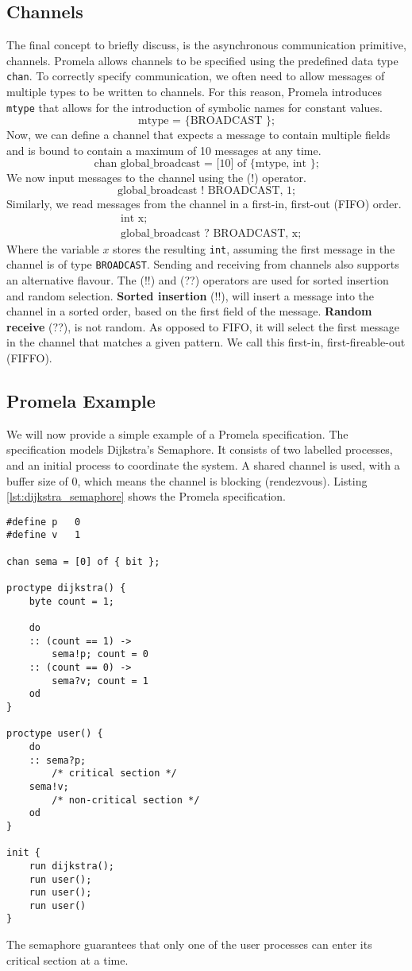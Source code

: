 \subsection{Channels}
The final concept to briefly discuss, is the asynchronous communication primitive, channels. Promela allows channels to be specified using the predefined data type \texttt{chan}. To correctly specify communication, we often need to allow messages of multiple types to be written to channels. For this reason, Promela introduces \texttt{mtype} that allows for the introduction of symbolic names for constant values.
\[
\text{mtype = \{ BROADCAST \};}
\]
Now, we can define a channel that expects a message to contain multiple fields and is bound to contain a maximum of 10 messages at any time.
\[
\text{chan global\_broadcast = [10] of \{ mtype, int \};}
\]
We now input messages to the channel using the (!) operator.
\[
\text{global\_broadcast ! BROADCAST, 1;}
\]
Similarly, we read messages from the channel in a first-in, first-out (FIFO) order.
\[
\begin{aligned}
& \text{int x;} \\
& \text{global\_broadcast ? BROADCAST, x;}
\end{aligned}
\]
Where the variable $x$ stores the resulting \texttt{int}, assuming the first message in the channel is of type \texttt{BROADCAST}. Sending and receiving from channels also supports an alternative flavour. The (!!) and (??) operators are used for sorted insertion and random selection. \textbf{Sorted insertion} (!!), will insert a message into the channel in a sorted order, based on the first field of the message. \textbf{Random receive} (??), is not random. As opposed to FIFO, it will select the first message in the channel that matches a given pattern. We call this first-in, first-fireable-out (FIFFO).
\subsection{Promela Example}
We will now provide a simple example of a Promela specification. The specification models Dijkstra's Semaphore. It consists of two labelled processes, and an initial process to coordinate the system. A shared channel is used, with a buffer size of 0, which means the channel is blocking (rendezvous). Listing \ref{lst:dijkstra_semaphore} shows the Promela specification.
\begin{lstlisting}[language=promela, xleftmargin=.3\linewidth, caption={Dijkstra's Semaphore in Promela}, label={lst:dijkstra_semaphore}]
#define p	0
#define v	1

chan sema = [0] of { bit };

proctype dijkstra() {	
    byte count = 1;

    do
    :: (count == 1) ->
        sema!p; count = 0
    :: (count == 0) ->
        sema?v; count = 1
    od	
}

proctype user() {	
    do
    :: sema?p;
        /* critical section */
    sema!v;
        /* non-critical section */
    od
}

init {	
    run dijkstra();
    run user();
    run user();
    run user()
}
\end{lstlisting}
The semaphore guarantees that only one of the user processes can enter its critical section at a time.
